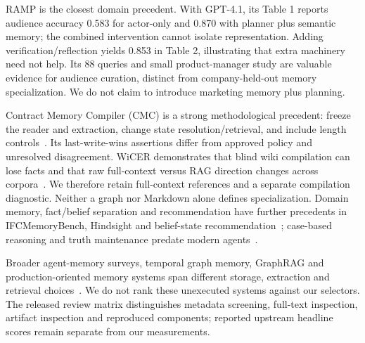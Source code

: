 RAMP is the closest domain precedent. With GPT-4.1, its Table 1 reports audience accuracy 0.583 for actor-only and 0.870 with planner plus semantic memory; the combined intervention cannot isolate representation. Adding verification/reflection yields 0.853 in Table 2, illustrating that extra machinery need not help. Its 88 queries and small product-manager study are valuable evidence for audience curation, distinct from company-held-out memory specialization. We do not claim to introduce marketing memory plus planning.

Contract Memory Compiler (CMC) is a strong methodological precedent: freeze the reader and extraction, change state resolution/retrieval, and include length controls~\citep{p260932658}. Its last-write-wins assertions differ from approved policy and unresolved disagreement. WiCER demonstrates that blind wiki compilation can lose facts and that raw full-context versus RAG direction changes across corpora~\citep{p260507068}. We therefore retain full-context references and a separate compilation diagnostic. Neither a graph nor Markdown alone defines specialization. Domain memory, fact/belief separation and recommendation have further precedents in IFCMemoryBench, Hindsight and belief-state recommendation~\citep{p260726072,p251212818,p260514401}; case-based reasoning and truth maintenance predate modern agents~\citep{aamodt1994,doyle1979}.

Broader agent-memory surveys, temporal graph memory, GraphRAG and production-oriented memory systems span different storage, extraction and retrieval choices~\citep{p251213564,p250113956,p240416130,p250419413}. We do not rank these unexecuted systems against our selectors. The released review matrix distinguishes metadata screening, full-text inspection, artifact inspection and reproduced components; reported upstream headline scores remain separate from our measurements.
